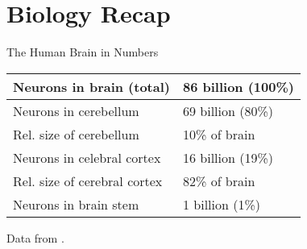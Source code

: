 \section{Biology Recap}



\begin{frame}[c]{The Human Brain in Numbers}
    \pause
    \begin{tabular}{ll}
        Neurons in brain (total) & 86 billion (100\%) \\ \hline \pause
        Neurons in cerebellum & 69 billion (80\%) \\ \pause
        Rel. size of cerebellum & 10\% of brain \\ \hline \pause
        Neurons in celebral cortex & 16 billion (19\%) \\ \pause
        Rel. size of cerebral cortex & 82\% of brain \\ \hline \pause
        Neurons in brain stem & 1 billion (1\%) \\
    \end{tabular}
    \newline
    \newline
    \newline
    Data from \cite{herculano2009human}.
\end{frame}


